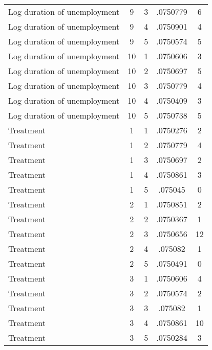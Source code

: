 \begin{tabular}{l*{4}{c}}
Log duration of unemployment&           9&           3&    .0750779&           6\\
Log duration of unemployment&           9&           4&    .0750901&           4\\
Log duration of unemployment&           9&           5&    .0750574&           5\\
Log duration of unemployment&          10&           1&    .0750606&           3\\
Log duration of unemployment&          10&           2&    .0750697&           5\\
Log duration of unemployment&          10&           3&    .0750779&           4\\
Log duration of unemployment&          10&           4&    .0750409&           3\\
Log duration of unemployment&          10&           5&    .0750738&           5\\
Treatment           &           1&           1&    .0750276&           2\\
Treatment           &           1&           2&    .0750779&           4\\
Treatment           &           1&           3&    .0750697&           2\\
Treatment           &           1&           4&    .0750861&           3\\
Treatment           &           1&           5&     .075045&           0\\
Treatment           &           2&           1&    .0750851&           2\\
Treatment           &           2&           2&    .0750367&           1\\
Treatment           &           2&           3&    .0750656&          12\\
Treatment           &           2&           4&     .075082&           1\\
Treatment           &           2&           5&    .0750491&           0\\
Treatment           &           3&           1&    .0750606&           4\\
Treatment           &           3&           2&    .0750574&           2\\
Treatment           &           3&           3&     .075082&           1\\
Treatment           &           3&           4&    .0750861&          10\\
Treatment           &           3&           5&    .0750284&           3\\

\end{tabular}
